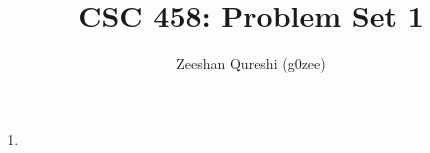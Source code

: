 \documentclass[11pt, titlepage]{article}
\title{CSC 458: Problem Set 1}
\author{Zeeshan Qureshi (g0zee)}
\begin{document}
\maketitle


\noindent
\begin{enumerate}


\item


\end{enumerate}
\end{document}
